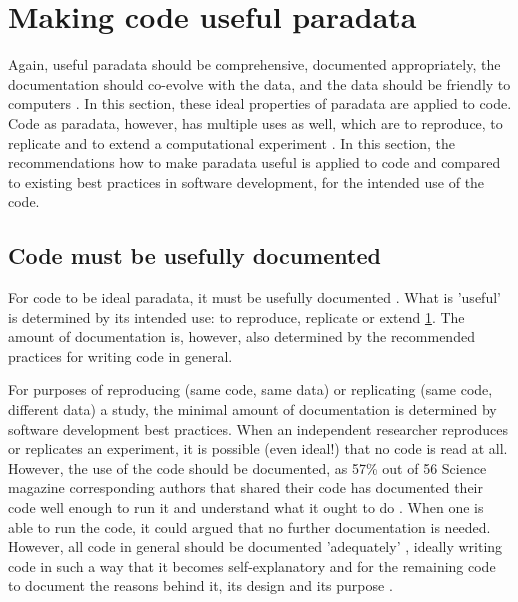 \section{Making code useful paradata}\label{sec:making-code-useful-paradata}

Again, useful paradata should be comprehensive, 
documented appropriately, the documentation should co-evolve with the data,
and the data should be friendly to computers \cite{huvila2022improving}.
In this section, these ideal properties of paradata are applied to code.
Code as paradata, however, has multiple uses as well,
which are to reproduce, to replicate and to 
extend a computational experiment \cite{benureau2018re}.
In this section, the recommendations how to make paradata useful
is applied to code and compared to existing best practices in software 
development, for the intended use of the code.

\subsection{Code must be usefully documented}

For code to be ideal paradata, it must be usefully documented \cite{huvila2022improving}.
What is 'useful' is determined by its intended use: 
to reproduce, replicate or extend \ref{sec:making-code-useful-paradata}.
The amount of documentation is, however, also determined
by the recommended practices for writing code in general. 

For purposes of reproducing (same code, same data) or replicating (same code,
different data) a study, the minimal amount of documentation
is determined by software development best practices.
When an independent researcher reproduces or replicates an experiment, 
it is possible (even ideal!) that no code is read at all.
However, the use of the code should be documented,
as 57\% out of 56 Science magazine corresponding authors 
that shared their code
has documented their code well enough to run it 
and understand what it ought to do \cite{stodden2018empirical}.
When one is able to run the code, it could argued 
that no further documentation is needed.
However, all code in general should be documented 
'adequately' \cite{peng2006reproducible},
ideally writing code in such a way that it becomes 
self-explanatory \cite{wilson2014best}
and for the remaining code to document the reasons behind it, 
its design and its purpose \cite{wilson2014best}.

